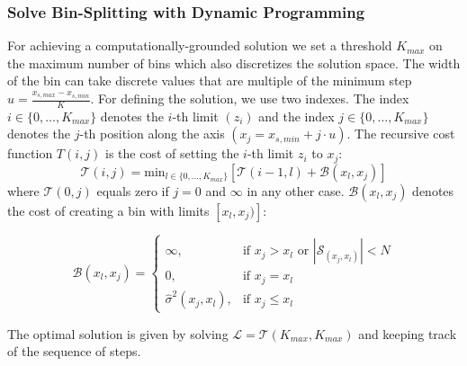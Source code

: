 \documentclass[twoside]{article}
\begin{document}
\subsubsection{Solve Bin-Splitting with Dynamic Programming}
\label{sec:dynamic-programing}

For achieving a computationally-grounded solution we set a threshold
\(K_{max}\) on the maximum number of bins which also discretizes the
solution space. The width of the bin can take discrete values that are
multiple of the minimum step
\(u = \frac{x_{s, max} - x_{s, min}}{K}\). For defining the solution,
we use two indexes. The index \(i \in \{0, \ldots, K_{max}\}\) denotes
the \(i\)-th limit \((z_i)\) and the index
\(j \in \{0, \ldots, K_{max}\} \) denotes the \(j\)-th position along
the axis \((x_j = x_{s,min} + j \cdot u)\). The recursive cost
function \(T(i,j)\) is the cost of setting the \(i\)-th limit \(z_i\)
to \(x_j\):
\begin{equation}
  \label{eq:recursive_cost}
  \mathcal{T}(i,j) = \mathrm{min}_{l \in \{0, \ldots, K_{max}\}} \left [ \mathcal{T}(i-1, l) + \mathcal{B}(x_l, x_j) \right ]
\end{equation}
%
where \(\mathcal{T}(0,j)\) equals zero if \(j=0\) and \(\infty\) in
any other case. \(\mathcal{B}(x_l, x_j)\) denotes the cost of creating a bin
with limits \([x_l, x_j)]\):

\begin{equation}
  \label{eq:cost_step}
  \mathcal{B}(x_l, x_j) = \begin{cases}
                            \infty, & \text{if $x_j > x_l$ or \(|\mathcal{S}_{(x_j, x_l)}| < N\)}\\
                            0, & \text{if $x_j = x_l$}\\
                            \hat{\sigma}^2(x_j, x_l), &\text{if $x_j \leq x_l$}
  \end{cases}
\end{equation}

The optimal solution is given by solving
\(\mathcal{L} = \mathcal{T}(K_{max}, K_{max})\) and keeping track of the sequence of
steps. 


\end{document}

